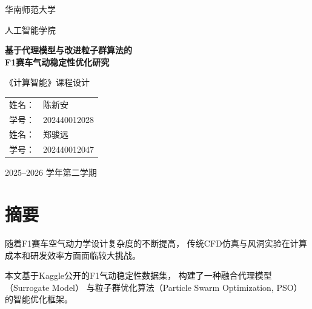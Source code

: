 \documentclass[UTF8,12pt,a4paper]{ctexart}
\begin{document}

\begin{titlepage}

\centering

\vspace*{2cm}

{\Huge\heiti 华南师范大学 \par}

\vspace{0.5cm}

{\Large 人工智能学院 \par}

\vspace{2.5cm}

{\Huge\bfseries
基于代理模型与改进粒子群算法的\\[0.4cm]
F1赛车气动稳定性优化研究
\par}

\vspace{2.5cm}

{\Large 《计算智能》课程设计}

\vfill

\begin{tabular}{rl}
姓名： & 陈新安 \\
学号： & 202440012028 \\[0.3cm]
姓名： & 郑骏远 \\
学号： & 202440012047
\end{tabular}

\vfill

{\large
2025--2026 学年第二学期
}

\vspace{1cm}

\end{titlepage}



\section*{摘要}

随着F1赛车空气动力学设计复杂度的不断提高，
传统CFD仿真与风洞实验在计算成本和研发效率方面面临较大挑战。

本文基于Kaggle公开的F1气动稳定性数据集，
构建了一种融合代理模型（Surrogate Model）
与粒子群优化算法（Particle Swarm Optimization, PSO）
的智能优化框架。
\end{document}
